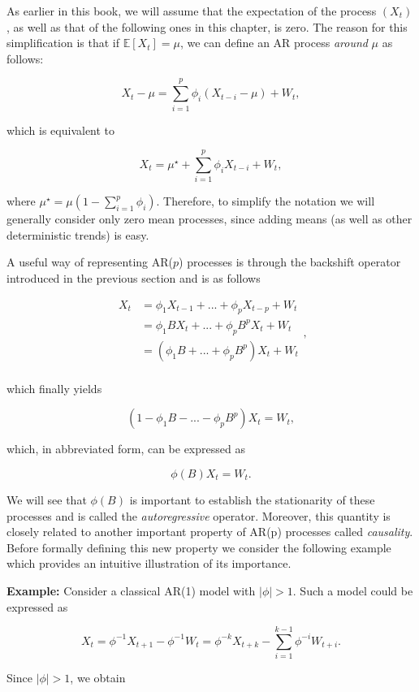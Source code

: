 \documentclass[]{book}
\theoremstyle{definition}
\theoremstyle{definition}
\theoremstyle{definition}
\theoremstyle{remark}
\begin{document}
As earlier in this book, we will assume that the expectation of the
process \(({X_t})\), as well as that of the following ones in this
chapter, is zero. The reason for this simplification is that if
\(\mathbb{E} [ X_t ] = \mu\), we can define an AR process \emph{around}
\(\mu\) as follows:

\[X_t - \mu = \sum_{i = 1}^p \phi_i \left(X_{t-i} - \mu \right) + W_t,\]

which is equivalent to

\[X_t  = \mu^{\star} +  \sum_{i = 1}^p \phi_i X_{t-i}  + W_t,\]

where \(\mu^{\star} = \mu (1 - \sum_{i = 1}^p \phi_i)\). Therefore, to
simplify the notation we will generally consider only zero mean
processes, since adding means (as well as other deterministic trends) is
easy.

A useful way of representing AR(\(p\)) processes is through the
backshift operator introduced in the previous section and is as follows

\[\begin{aligned}
  {X_t} &= {\phi_1}{X_{t - 1}} + ... + {\phi_p}{X_{t - p}} + {W_t} \\
   &= {\phi_1}B{X_t} + ... + {\phi_p}B^p{X_t} + {W_t} \\
   &= ({\phi_1}B + ... + {\phi_p}B^p){X_t} + {W_t} \\ 
\end{aligned},\]

which finally yields

\[(1 - {\phi _1}B - ... - {\phi_p}B^p){X_t} = {W_t},\]

which, in abbreviated form, can be expressed as

\[\phi(B){X_t} = W_t.\]

We will see that \(\phi(B)\) is important to establish the stationarity
of these processes and is called the \emph{autoregressive} operator.
Moreover, this quantity is closely related to another important property
of AR(p) processes called \emph{causality}. Before formally defining
this new property we consider the following example which provides an
intuitive illustration of its importance.

\textbf{Example:} Consider a classical AR(1) model with \(|\phi| > 1\).
Such a model could be expressed as

\[X_t = \phi^{-1} X_{t+1} - \phi^{-1} W_t = \phi^{-k} X_{t+k} - \sum_{i = 1}^{k-1} \phi^{-i} W_{t+i}.\]

Since \(|\phi| > 1\), we obtain
\end{document}
